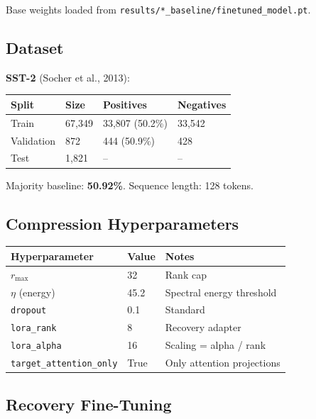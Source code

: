 Base weights loaded from \texttt{results/*\_baseline/finetuned\_model.pt}.

\subsection{Dataset}

\textbf{SST-2} (Socher et al., 2013):

\begin{table}[H]
\centering
\small
\begin{tabular}{llll}
\toprule
\textbf{Split} & \textbf{Size} & \textbf{Positives} & \textbf{Negatives} \\
\midrule
Train & 67,349 & 33,807 (50.2\%) & 33,542 \\
Validation & 872 & 444 (50.9\%) & 428 \\
Test & 1,821 & -- & -- \\
\bottomrule
\end{tabular}
\end{table}

Majority baseline: \textbf{50.92\%}. Sequence length: 128 tokens.

\subsection{Compression Hyperparameters}

\begin{table}[H]
\centering
\small
\begin{tabular}{lll}
\toprule
\textbf{Hyperparameter} & \textbf{Value} & \textbf{Notes} \\
\midrule
$r_\text{max}$ & 32 & Rank cap \\
$\eta$ (energy) & 45.2 & Spectral energy threshold \\
\texttt{dropout} & 0.1 & Standard \\
\texttt{lora\_rank} & 8 & Recovery adapter \\
\texttt{lora\_alpha} & 16 & Scaling = alpha / rank \\
\texttt{target\_attention\_only} & True & Only attention projections \\
\bottomrule
\end{tabular}
\end{table}

\subsection{Recovery Fine-Tuning}


